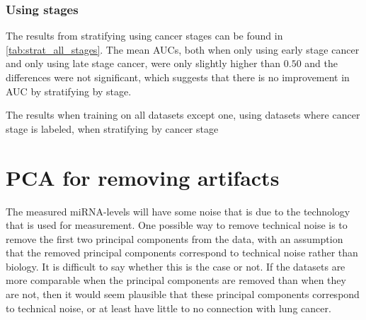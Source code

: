 {{{{{{{{{{{{\subsubsection{Using stages}
The results from stratifying using cancer stages can be found in \autoref{tab:strat_all_stages}. The mean AUCs, both when only using early stage cancer and only using late stage cancer, were only slightly higher than $0.50$ and the differences were not significant, which suggests that there is no improvement in AUC by stratifying by stage.

\begin{table}
    \caption{The results when training on all datasets except one, using datasets where cancer stage is labeled, when stratifying by cancer stage}
    \label{tab:strat_all_stages}
    \begin{center}
    \end{center}
\end{table}

\section{PCA for removing artifacts}
\label{sec:pca_remove_artifacts_res}
The measured miRNA-levels will have some noise that is due to the technology that is used for measurement. One possible way to remove technical noise is to remove the first two principal components from the data, with an assumption that the removed principal components correspond to technical noise rather than biology. It is difficult to say whether this is the case or not. If the datasets are more comparable when the principal components are removed than when they are not, then it would seem plausible that these principal components correspond to technical noise, or at least have little to no connection with lung cancer.


}}}}}}}}}}}}
